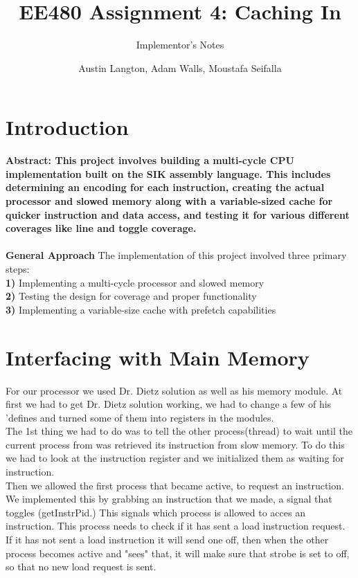 \documentclass[12pt, twocolumn]{scrartcl}
\begin{document}
\title{EE480 Assignment 4: Caching In}
\subtitle {Implementor's Notes}
\author{Austin Langton, Adam Walls, Moustafa Seifalla\\
}
\maketitle

\section*{Introduction}
\textbf {Abstract: This project involves building a multi-cycle CPU implementation built on the SIK assembly language. This includes determining an encoding for each instruction, creating the actual processor and slowed memory along with a variable-sized cache for quicker instruction and data access, and testing it for various different coverages like line and toggle coverage. } 
\\
\\
\textbf{{General Approach}}
The implementation of this project involved three primary steps:\\
\textbf {1)} Implementing a multi-cycle processor and slowed memory \\
\textbf {2)} Testing the design for coverage and proper functionality \\
\textbf {3)} Implementing a variable-size cache with prefetch capabilities \\


\section*{Interfacing with Main Memory}
For our processor we used Dr. Dietz solution as well as his memory module.  At first we had to get Dr. Dietz solution working,  we had to change a few of his 'defines and turned some of them into registers in the modules. \\

The 1st thing we had to do was to tell the other process(thread) to wait until the current process from was retrieved its instruction from slow memory. To do this we had to look at the instruction register and we initialized them as waiting for instruction. \\

Then we allowed the first process that became active, to request an instruction.  We implemented this by grabbing an instruction that we made, a signal that toggles (getInstrPid.) This signals which process is allowed to acces an instruction.  This process needs to check if it has sent a load instruction request.  If it has not sent a load instruction it will send one off, then when the other process becomes active and "sees" that, it will make sure that strobe is set to off, so that no new load request is sent.  \\
\end{document}
